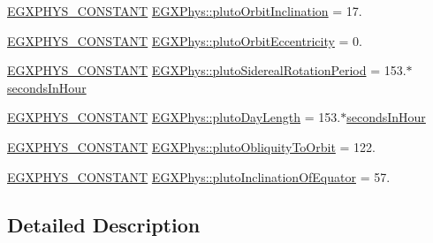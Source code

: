 \begin{DoxyCompactItemize}
\item 
\mbox{\hyperlink{group___e_g_x_phys-_constants-_macros_ga76980d288494ce1714c9ac68a95ba702}{E\+G\+X\+P\+H\+Y\+S\+\_\+\+C\+O\+N\+S\+T\+A\+NT}} \mbox{\hyperlink{group___e_g_x_phys-_constants-_astrophysics-_solar_system-_pluto-_orbit_ga6d2bac1a0cdd37f32f5a089608e7ce27}{E\+G\+X\+Phys\+::pluto\+Orbit\+Inclination}} = 17.
\item 
\mbox{\hyperlink{group___e_g_x_phys-_constants-_macros_ga76980d288494ce1714c9ac68a95ba702}{E\+G\+X\+P\+H\+Y\+S\+\_\+\+C\+O\+N\+S\+T\+A\+NT}} \mbox{\hyperlink{group___e_g_x_phys-_constants-_astrophysics-_solar_system-_pluto-_orbit_gac4e198fcea423f14df3db2d03c384cf4}{E\+G\+X\+Phys\+::pluto\+Orbit\+Eccentricity}} = 0.
\item 
\mbox{\hyperlink{group___e_g_x_phys-_constants-_macros_ga76980d288494ce1714c9ac68a95ba702}{E\+G\+X\+P\+H\+Y\+S\+\_\+\+C\+O\+N\+S\+T\+A\+NT}} \mbox{\hyperlink{group___e_g_x_phys-_constants-_astrophysics-_solar_system-_pluto-_orbit_ga4c42f3baa2194f4c57c975114089e5ac}{E\+G\+X\+Phys\+::pluto\+Sidereal\+Rotation\+Period}} = 153.$\ast$\mbox{\hyperlink{namespace_e_g_x_phys_a7c3165cd93e36f1fb8e9fef80f117bef}{seconds\+In\+Hour}}
\item 
\mbox{\hyperlink{group___e_g_x_phys-_constants-_macros_ga76980d288494ce1714c9ac68a95ba702}{E\+G\+X\+P\+H\+Y\+S\+\_\+\+C\+O\+N\+S\+T\+A\+NT}} \mbox{\hyperlink{group___e_g_x_phys-_constants-_astrophysics-_solar_system-_pluto-_orbit_gabb53431474dd4d2fc98116f18052cf51}{E\+G\+X\+Phys\+::pluto\+Day\+Length}} = 153.$\ast$\mbox{\hyperlink{namespace_e_g_x_phys_a7c3165cd93e36f1fb8e9fef80f117bef}{seconds\+In\+Hour}}
\item 
\mbox{\hyperlink{group___e_g_x_phys-_constants-_macros_ga76980d288494ce1714c9ac68a95ba702}{E\+G\+X\+P\+H\+Y\+S\+\_\+\+C\+O\+N\+S\+T\+A\+NT}} \mbox{\hyperlink{group___e_g_x_phys-_constants-_astrophysics-_solar_system-_pluto-_orbit_ga0cbc850b3e47ba5f7776fd3c299fe531}{E\+G\+X\+Phys\+::pluto\+Obliquity\+To\+Orbit}} = 122.
\item 
\mbox{\hyperlink{group___e_g_x_phys-_constants-_macros_ga76980d288494ce1714c9ac68a95ba702}{E\+G\+X\+P\+H\+Y\+S\+\_\+\+C\+O\+N\+S\+T\+A\+NT}} \mbox{\hyperlink{group___e_g_x_phys-_constants-_astrophysics-_solar_system-_pluto-_orbit_ga2d8172ce3f1ca01e0db019dfde383a08}{E\+G\+X\+Phys\+::pluto\+Inclination\+Of\+Equator}} = 57.
\end{DoxyCompactItemize}


\subsection{Detailed Description}


